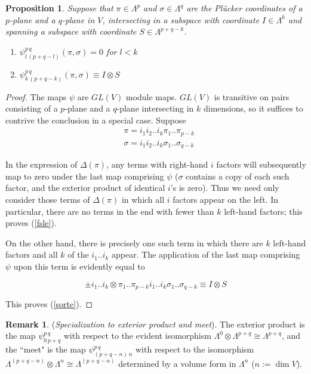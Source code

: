 \documentclass[12pt]{article}
\numberwithin{equation}{section}
\theoremstyle{plain}
\newtheorem{proposition}[definition]{Proposition}
\theoremstyle{definition}
\newtheorem{remark}[definition]{Remark}
\renewcommand{\L}{\Lambda}
\newcommand{\GL}{GL}
\begin{document}
\begin{proposition}\label{sortingmapsis} Suppose that $\pi\in \L^{p}$ and $\sigma \in \L^{q}$ are the Pl\"ucker coordinates of a $p$-plane and a $q$-plane in $V$, intersecting in a subspace with coordinate $I\in\L^{k}$ and spanning a subspace with coordinate $S\in \L^{p+q-k}$.
\begin{enumerate}
\item{\label{fsle}$\psi^{p\,q}_{l\,(p+q-l)}(\pi,\sigma)=0$ for $l<k$}
\item{\label{sorte}$\psi^{p\,q}_{k\,(p+q-k)}(\pi,\sigma)\equiv I\otimes S$}
\end{enumerate}
\end{proposition}
\begin{proof} The maps $\psi$ are $\GL(V)$ module maps. $\GL(V)$ is transitive on pairs consisting of a $p$-plane and a $q$-plane intersecting in $k$ dimensions, so it suffices to contrive the conclusion in a special case. Suppose
\begin{align*}
&\pi = i_1i_2..i_k\pi_1..\pi_{p-k}\\
&\sigma = i_1i_2..i_k\sigma_1..\sigma_{q-k}
\end{align*}

In the expression of $\Delta(\pi)$, any terms with right-hand $i$ factors will subsequently map to zero under the last map comprising $\psi$ ($\sigma$ contains a copy of each such factor, and the exterior product of identical $i$'s is zero). Thus we need only consider those terms of $\Delta(\pi)$ in which all $i$ factors appear on the left. In particular, there are no terms in the end with fewer than $k$ left-hand factors; this proves (\ref{fsle}).

On the other hand, there is precisely one such term in which there are $k$ left-hand factors and all $k$ of the $i_1..i_k$ appear. The application of the last map comprising $\psi$ upon this term is evidently equal to

\[\pm i_1..i_k\otimes \pi_1..\pi_{p-k}i_1..i_k\sigma_1..\sigma_{q-k}\equiv I\otimes S\]

This proves (\ref{sorte}).

\end{proof}

\begin{remark}(\emph{Specialization to exterior product and meet}).  The exterior product is the map $\psi^{p\,q}_{0\,p+q}$ with respect to the evident isomorphism $\L^{0}\otimes \L^{p+q}\cong \L^{p+q}$, and the ``meet" is the map $\psi^{p\,q}_{(p+q-n)\,n}$ with respect to the isomorphism $\L^{(p+q-n)}\otimes \L^{n}\cong \L^{(p+q-n)}$ determined by a volume form in $\L^{n}$ ($n:= \dim V$).
\end{remark}
\end{document}
